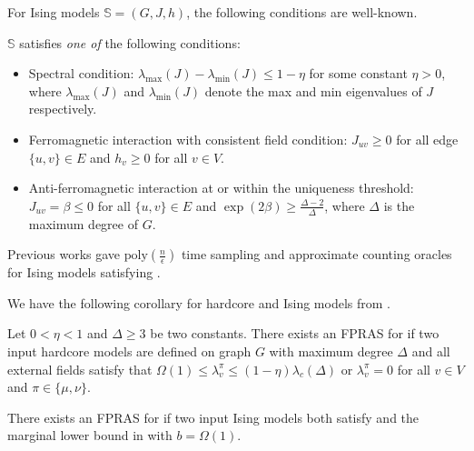 For Ising models $\mathbb{S} = (G,J,h)$, the following conditions are well-known.
\begin{condition}\label{cond:Ising}
$\mathbb{S}$ satisfies \emph{one of} the following conditions:
\begin{itemize}
    \item Spectral condition: $\lambda_{\max}(J) - \lambda_{\min}(J) \leq 1 - \eta$ for some constant $\eta > 0$, where  $\lambda_{\max}(J)$ and $\lambda_{\min}(J)$ denote the max and min eigenvalues of $J$ respectively.
    \item Ferromagnetic interaction with consistent field condition: $J_{uv} \geq 0$ for all edge $\{u,v\} \in E$ and $h_v \geq 0$ for all $v \in V$. 
    \item Anti-ferromagnetic interaction at or within the uniqueness threshold: $J_{uv}=\beta\leq 0$ for all $\{u,v\} \in E$ and $\exp(2\beta) \geq \frac{\Delta-2}{\Delta} $, where $\Delta$ is the maximum degree of $G$.
\end{itemize}
\end{condition}

Previous works \cite{AJKPV22, FengGW23,JS93,CCYZ24,JVV86,SVV09} gave $\mathrm{poly}(\frac{n}{\epsilon})$ time sampling and approximate counting oracles for Ising models satisfying .

We have the following corollary for hardcore and Ising models from .



\begin{corollary}\label{Cor:Ising}
Let $0 < \eta < 1$ and $\Delta \geq 3$ be two constants.
There exists an FPRAS for  if two input hardcore models are defined on graph $G$ with maximum degree $\Delta$ and all external fields satisfy that $\Omega(1) \leq \lambda^\pi_v \leq (1 - \eta)\lambda_c(\Delta)$ or $\lambda^\pi_v = 0$ for all $v \in V$ and $\pi \in \{\mu,\nu\}$.

There exists an FPRAS for  if two input Ising models both satisfy  and the marginal lower bound in  with $b = \Omega(1)$.
\end{corollary}

 



